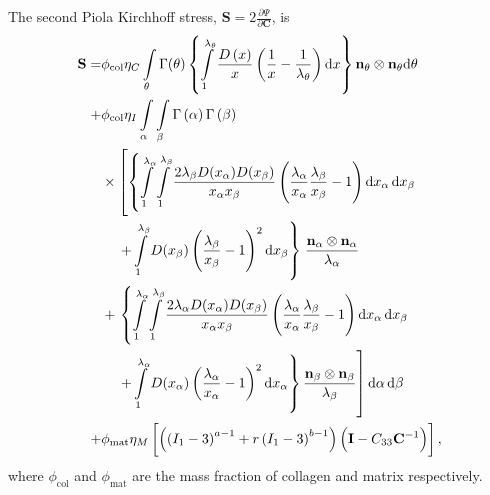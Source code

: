 The second Piola Kirchhoff stress, $\mathbf{S}=2\frac{\partial\Psi}{\partial\mathbf{C}}$, is 
\begin{equation} \label{eqn:fullcollagen}
\begin{aligned}
\mathbf{S} = & \phi_\mathrm{col} \eta_C \int\displaylimits_\theta \Gamma(\theta)\left\lbrace 
\int\displaylimits_1^{\lambda_\theta} \frac{D\left( x \right)}{x} \left( \frac{1}{x}- \frac{1}{\lambda_\theta}\right) \mathrm{d}x \right\rbrace \mathbf{n}_\theta\otimes\mathbf{n}_\theta \mathrm{d}\theta \\
+ & \phi_\mathrm{col} \eta_I \int\displaylimits_\alpha \int\displaylimits_\beta \Gamma \left(\alpha \right) \Gamma \left( \beta \right) \\
& \times \left[ \left\lbrace 
\int\displaylimits_1^{\lambda_\alpha} \int\displaylimits_1^{\lambda_\beta} 
\frac{2 \lambda_\beta D(x_\alpha) D(x_\beta)}{x_\alpha x_\beta} 
\left( \frac{\lambda_\alpha}{x_\alpha} \frac{\lambda_\beta}{x_\beta} - 1\right) \mathrm{d}x_\alpha \, \mathrm{d}x_\beta\right.\right.   \\
&\quad\left.\left.+\int\displaylimits_1^{\lambda_\beta} D(x_\beta) \left( \frac{\lambda_\beta}{x_\beta} -1  \right)^2 \mathrm{d}x_\beta \right\rbrace \right.  \frac{\mathbf{n}_\alpha \otimes \mathbf{n}_\alpha}{\lambda_\alpha}  \\
& + \left. \left\lbrace
\int\displaylimits_1^{\lambda_\alpha} \int\displaylimits_1^{\lambda_\beta} 
\frac{2 \lambda_\alpha D(x_\alpha) D(x_\beta)}{x_\alpha x_\beta} 
\left( \frac{\lambda_\alpha}{x_\alpha} \frac{\lambda_\beta}{x_\beta} - 1\right) \mathrm{d}x_\alpha \, \mathrm{d}x_\beta\right.\right.   \\
&\quad \left.\left. + \int\displaylimits_1^{\lambda_\alpha} D(x_\alpha) \left( \frac{\lambda_\alpha}{x_\alpha} -1  \right)^2 \mathrm{d}x_\alpha \right\rbrace \frac{\mathbf{n}_\beta \otimes \mathbf{n}_\beta}{\lambda_\beta}  \right] \mathrm{d}\alpha \, \mathrm{d}\beta\\
+ & \phi_\mathrm{mat} \eta_M \left[\left(\left( I_1 - 3\right)^{a - 1} + r \left( I_1 - 3\right)^{b - 1}\right) \left( \mathbf{I} - C_{33}\mathbf{C}^{-1}\right)  \right],\\
\end{aligned}
\end{equation}
    where $\phi_\mathrm{col}$ and $\phi_\mathrm{mat}$ are the mass fraction of collagen and matrix respectively. 
    
